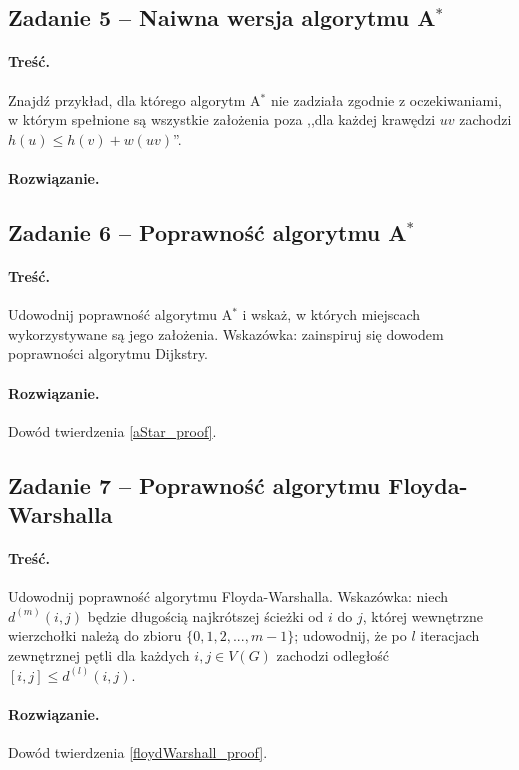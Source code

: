 \subsection{Zadanie 5 -- Naiwna wersja algorytmu A\texorpdfstring{$^*$}{TEXT}}
\paragraph{Treść.}Znajdź przykład, dla 
którego algorytm A$^*$ nie zadziała zgodnie z oczekiwaniami, 
w którym spełnione
są wszystkie założenia 
poza 
,,dla każdej krawędzi $uv$ zachodzi $h(u) \leq h(v) + w(uv)$''.

\paragraph{Rozwiązanie.}%

\subsection{Zadanie 6 -- Poprawność algorytmu A\texorpdfstring{$^*$}{TEXT}}
\paragraph{Treść.}Udowodnij poprawność algorytmu 
A$^*$ i wskaż, w których miejscach wykorzystywane są jego założenia.
Wskazówka: zainspiruj się dowodem poprawności algorytmu Dijkstry.

\paragraph{Rozwiązanie.}Dowód twierdzenia \ref{aStar_proof}.

\subsection{Zadanie 7 -- Poprawność algorytmu Floyda-Warshalla}
\paragraph{Treść.}Udowodnij poprawność algorytmu Floyda-Warshalla. 
Wskazówka: niech 
$d^{(m)}(i, j)$ będzie długością
najkrótszej ścieżki od $i$ do $j$, której wewnętrzne wierzchołki należą
do zbioru $\{0, 1, 2, . . . , m - 1\}$; 
udowodnij, że po $l$
iteracjach zewnętrznej pętli dla każdych $i, j \in V (G)$ zachodzi 
odległość$[i, j] \leq d^{(l)}(i, j)$.

\paragraph{Rozwiązanie.}Dowód twierdzenia \ref{floydWarshall_proof}.
